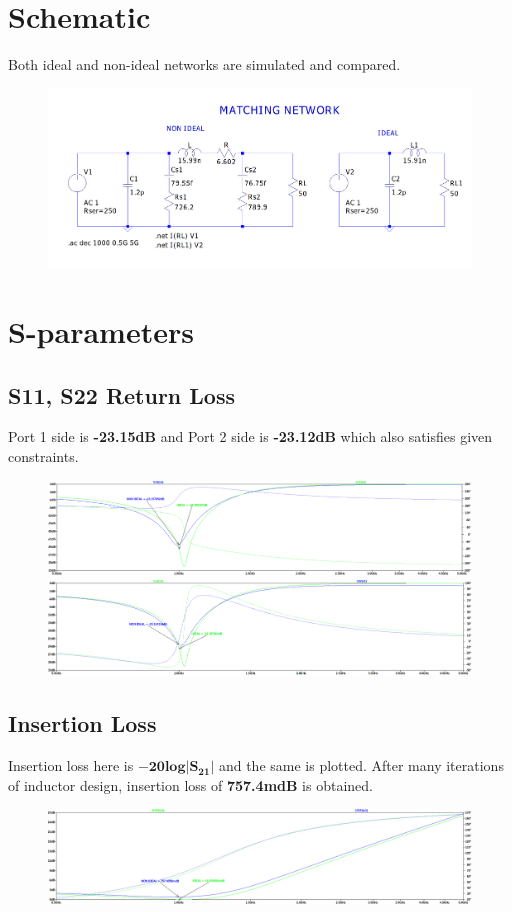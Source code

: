 \documentclass{article}
\begin{document}
\section*{\hfil Schematic}
Both ideal and non-ideal networks are simulated and compared.
\begin{figure}[H]
	\centering
	\includegraphics[scale=0.3]{./figs/schematic.png}
\end{figure}
\section*{\hfil S-parameters}
\subsection*{S11, S22 Return Loss}
Port 1 side is \textbf{-23.15dB} and Port 2 side is \textbf{-23.12dB} which also satisfies given constraints.
\begin{figure}[H]
	\centering
	\includegraphics[scale=0.27]{./figs/s11.png}\\
	\includegraphics[scale=0.27]{./figs/s22.png}
\end{figure}
\subsection*{Insertion Loss}
Insertion loss here is $\mathbf{-20log|S_{21}|}$ and the same is plotted. After many iterations of inductor design, insertion loss of \textbf{757.4mdB} is obtained.
\begin{figure}[H]
	\centering
	\includegraphics[scale=0.27]{./figs/s21.png}
\end{figure}
\end{document}
